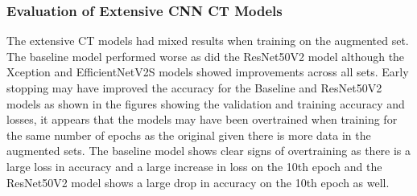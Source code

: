 \subsubsection{Evaluation of Extensive CNN CT Models}
The extensive CT models had mixed results when training on the augmented set.  The baseline model performed worse as did the ResNet50V2 model although the Xception and EfficientNetV2S models showed improvements across all sets.  Early stopping may have improved the accuracy for the Baseline and ResNet50V2 models as shown in the figures showing the validation and training accuracy and losses, it appears that the models may have been overtrained when training for the same number of epochs as the original given there is more data in the augmented sets.  The baseline model shows clear signs of overtraining as there is a large loss in accuracy and a large increase in loss on the 10th epoch and the ResNet50V2 model shows a large drop in accuracy on the 10th epoch as well.
